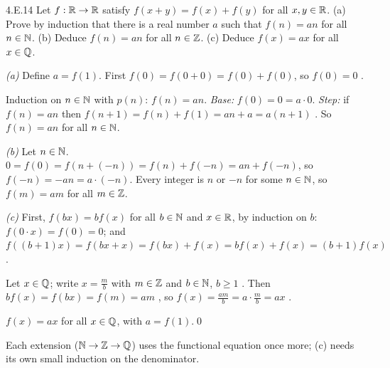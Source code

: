 \begin{bookex}[recommended]{4.E.14}
Let $f:\mathbb{R}\to\mathbb{R}$ satisfy $f(x+y)=f(x)+f(y)$ for all $x,y\in\mathbb{R}$. (a) Prove by induction that there is a real number $a$ such that $f(n)=an$ for all $n\in\mathbb{N}$. (b) Deduce $f(n)=an$ for all $n\in\mathbb{Z}$. (c) Deduce $f(x)=ax$ for all $x\in\mathbb{Q}$.
\solution
\begin{steps}
\item \emph{(a)} Define $a=f(1)$. First $f(0)=f(0+0)=f(0)+f(0)$, so $f(0)=0$ .
\item Induction on $n\in\mathbb{N}$ with $p(n)$: $f(n)=an$. \emph{Base:} $f(0)=0=a\cdot0$. \emph{Step:} if $f(n)=an$ then $f(n+1)=f(n)+f(1)=an+a=a(n+1)$ . So $f(n)=an$ for all $n\in\mathbb{N}$.
\item \emph{(b)} Let $n\in\mathbb{N}$. $0=f(0)=f(n+(-n))=f(n)+f(-n)=an+f(-n)$, so $f(-n)=-an=a\cdot(-n)$. Every integer is $n$ or $-n$ for some $n\in\mathbb{N}$, so $f(m)=am$ for all $m\in\mathbb{Z}$.
\item \emph{(c)} First, $f(bx)=bf(x)$ for all $b\in\mathbb{N}$ and $x\in\mathbb{R}$, by induction on $b$: $f(0\cdot x)=f(0)=0$; and $f((b+1)x)=f(bx+x)=f(bx)+f(x)=bf(x)+f(x)=(b+1)f(x)$.
\item Let $x\in\mathbb{Q}$; write $x=\frac mb$ with $m\in\mathbb{Z}$ and $b\in\mathbb{N}$, $b\ge1$ . Then $bf(x)=f(bx)=f(m)=am$ , so $f(x)=\frac{am}b=a\cdot\frac mb=ax$ .
\end{steps}
\conclusion $f(x)=ax$ for all $x\in\mathbb{Q}$, with $a=f(1)$.\qed
\begin{compare}
\item Each extension ($\mathbb{N}\to\mathbb{Z}\to\mathbb{Q}$) uses the functional equation once more; (c) needs its own small induction on the denominator.
\end{compare}
\end{bookex}

